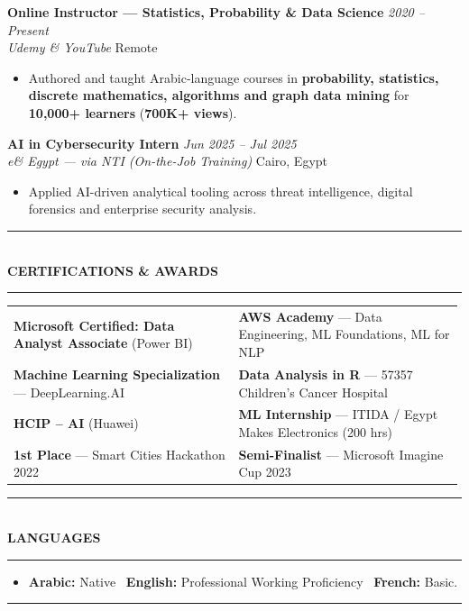 \documentclass[10pt, a4paper]{article}
\makeatletter
\newcommand{\cvsection}[1]{%
  \vspace{3pt}%
  {\color{navy}\rule{\linewidth}{1.1pt}}\\[0.5pt]%
  {\color{navy}\bfseries\fontsize{9.5}{11}\selectfont\uppercase{#1}}\\[-4pt]%
  {\color{teal}\rule{\linewidth}{0.6pt}}%
  \vspace{2pt}%
}
\newcommand{\cventry}[4]{%
  \vspace{2.5pt}%
  \textbf{\color{darkgray}#1} \hfill {\color{midgray}\textit{#3}}\\[-1.5pt]%
  {\color{teal}\textit{#2}} \hfill {\color{midgray}#4}%
}
\newenvironment{cvitems}{%
  \begin{itemize}[leftmargin=11pt, itemsep=0.5pt, parsep=0pt, topsep=1pt,
                  label={\textcolor{teal}{$\bullet$}}]
}{%
  \end{itemize}%
}
\newenvironment{dualcol}{%
  \begin{tabular*}{\linewidth}{@{}p{0.495\linewidth}@{\hspace{0.01\linewidth}}p{0.495\linewidth}@{}}
}{%
  \end{tabular*}%
}
\makeatother
\begin{document}
\cventry{Online Instructor --- Statistics, Probability \& Data Science}{Udemy \& YouTube}
        {2020 -- Present}{Remote}
\begin{cvitems}
  \item Authored and taught Arabic-language courses in \textbf{probability, statistics, discrete mathematics, algorithms and graph data mining} for \textbf{10,000+ learners} (\textbf{700K+ views}).
\end{cvitems}

\cventry{AI in Cybersecurity Intern}{e\& Egypt --- via NTI (On-the-Job Training)}
        {Jun 2025 -- Jul 2025}{Cairo, Egypt}
\begin{cvitems}
  \item Applied AI-driven analytical tooling across threat intelligence, digital forensics and enterprise security analysis.
\end{cvitems}

\cvsection{Certifications \& Awards}

\begin{dualcol}
  \textbf{Microsoft Certified: Data Analyst Associate} (Power BI) &
  \textbf{AWS Academy} --- Data Engineering, ML Foundations, ML for NLP \\[2pt]
  \textbf{Machine Learning Specialization} --- DeepLearning.AI &
  \textbf{Data Analysis in R} --- 57357 Children's Cancer Hospital \\[2pt]
  \textbf{HCIP -- AI} (Huawei) &
  \textbf{ML Internship} --- ITIDA / Egypt Makes Electronics (200 hrs) \\[2pt]
  \textbf{1st Place} --- Smart Cities Hackathon 2022 &
  \textbf{Semi-Finalist} --- Microsoft Imagine Cup 2023 \\
\end{dualcol}

\cvsection{Languages}

\begin{cvitems}
  \item \textbf{Arabic:} Native \textperiodcentered\ \textbf{English:} Professional Working Proficiency \textperiodcentered\ \textbf{French:} Basic.
\end{cvitems}

\vspace{3pt}
{\color{navy}\rule{\linewidth}{0.8pt}}
\end{document}

